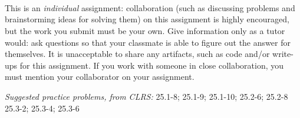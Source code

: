 \documentclass[letterpaper,11pt]{article}
\begin{document}


 \\

 \\
 \\

This is an \emph{individual} assignment: collaboration (such as discussing problems and brainstorming ideas for solving them) on this assignment is highly encouraged, but the work you submit must be your own. Give information only as a tutor would: ask questions so that your classmate is able to figure out the answer for themselves. It is unacceptable to share any artifacts, such as code and/or write-ups for this assignment. If you work with someone in close collaboration, you must mention your collaborator on your assignment.

\emph{Suggested practice problems, from CLRS:} 25.1-8; 25.1-9; 25.1-10; 25.2-6; 25.2-8 25.3-2; 25.3-4; 25.3-6
\end{document}
